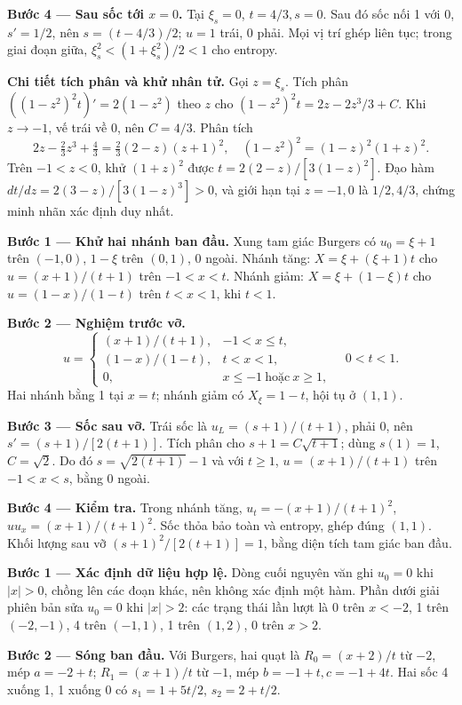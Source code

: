 \textbf{Bước 4 — Sau sốc tới $x=0$.} Tại $\xi_s=0$, $t=4/3,s=0$. Sau đó sốc nối 1 với 0, $s' =1/2$, nên $s=(t-4/3)/2$; $u=1$ trái, 0 phải. Mọi vị trí ghép liên tục; trong giai đoạn giữa, $\xi_s^2<(1+\xi_s^2)/2<1$ cho entropy.

\textbf{Chi tiết tích phân và khử nhân tử.} Gọi $z=\xi_s$. Tích phân $( (1-z^2)^2t)'=2(1-z^2)$ theo $z$ cho $(1-z^2)^2t=2z-2z^3/3+C$. Khi $z\to-1$, vế trái về $0$, nên $C=4/3$. Phân tích
\[2z-\tfrac23z^3+\tfrac43=\tfrac23(2-z)(z+1)^2,\quad
(1-z^2)^2=(1-z)^2(1+z)^2.\]
Trên $-1<z<0$, khử $(1+z)^2$ được $t=2(2-z)/[3(1-z)^2]$. Đạo hàm $dt/dz=2(3-z)/[3(1-z)^3]>0$, và giới hạn tại $z=-1,0$ là $1/2,4/3$, chứng minh nhãn xác định duy nhất.

\textbf{Bước 1 — Khử hai nhánh ban đầu.} Xung tam giác Burgers có $u_0=\xi+1$ trên $(-1,0)$, $1-\xi$ trên $(0,1)$, 0 ngoài. Nhánh tăng: $X=\xi+(\xi+1)t$ cho $u=(x+1)/(t+1)$ trên $-1<x<t$. Nhánh giảm: $X=\xi+(1-\xi)t$ cho $u=(1-x)/(1-t)$ trên $t<x<1$, khi $t<1$.

\textbf{Bước 2 — Nghiệm trước vỡ.}
\[u=\begin{cases}(x+1)/(t+1),&-1<x\le t,\\(1-x)/(1-t),&t<x<1,\\0,&x\le-1\ \text{hoặc}\ x\ge1,\end{cases}\quad0<t<1.\]
Hai nhánh bằng 1 tại $x=t$; nhánh giảm có $X_\xi=1-t$, hội tụ ở $(1,1)$.

\textbf{Bước 3 — Sốc sau vỡ.} Trái sốc là $u_L=(s+1)/(t+1)$, phải 0, nên $s'=(s+1)/[2(t+1)]$. Tích phân cho $s+1=C\sqrt{t+1}$; dùng $s(1)=1$, $C=\sqrt2$. Do đó $s=\sqrt{2(t+1)}-1$ và với $t\ge1$, $u=(x+1)/(t+1)$ trên $-1<x<s$, bằng 0 ngoài.

\textbf{Bước 4 — Kiểm tra.} Trong nhánh tăng, $u_t=-(x+1)/(t+1)^2$, $uu_x=(x+1)/(t+1)^2$. Sốc thỏa bảo toàn và entropy, ghép đúng $(1,1)$. Khối lượng sau vỡ $(s+1)^2/[2(t+1)]=1$, bằng diện tích tam giác ban đầu.

\textbf{Bước 1 — Xác định dữ liệu hợp lệ.} Dòng cuối nguyên văn ghi $u_0=0$ khi $|x|>0$, chồng lên các đoạn khác, nên không xác định một hàm. Phần dưới giải phiên bản sửa $u_0=0$ khi $|x|>2$: các trạng thái lần lượt là 0 trên $x<-2$, 1 trên $(-2,-1)$, 4 trên $(-1,1)$, 1 trên $(1,2)$, 0 trên $x>2$.

\textbf{Bước 2 — Sóng ban đầu.} Với Burgers, hai quạt là $R_0=(x+2)/t$ từ $-2$, mép $a=-2+t$; $R_1=(x+1)/t$ từ $-1$, mép $b=-1+t,c=-1+4t$. Hai sốc 4 xuống 1, 1 xuống 0 có $s_1=1+5t/2$, $s_2=2+t/2$.


